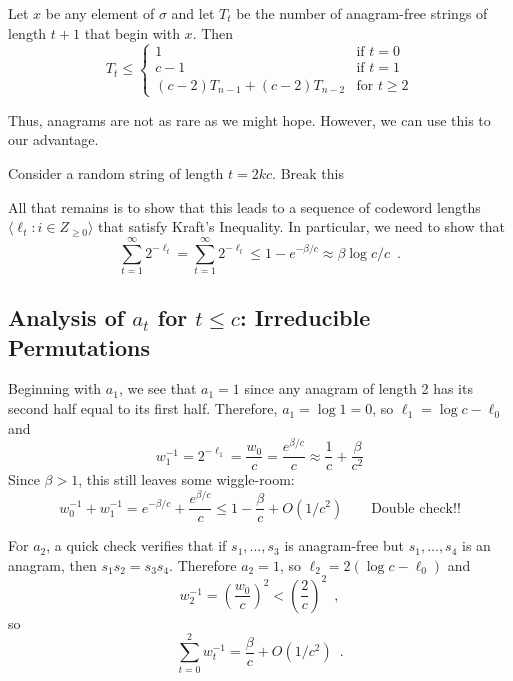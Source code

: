 \documentclass{patmorin}
\begin{document}
Let $x$ be any element of $\sigma$ and let $T_t$ be the number of anagram-free strings of length $t+1$ that begin with $x$.  Then
\[
   T_t \le \begin{cases}
         1 & \text{if $t=0$} \\
         c-1 & \text{if $t=1$} \\
         (c-2)T_{n-1} + (c-2)T_{n-2} & \text{for $t\ge 2$}
       \end{cases}
\]



Thus, anagrams are not as rare as we might hope.  However, we can use this to our advantage.

Consider a random string of length $t=2kc$.  Break this 















All that remains is to show that this leads to a sequence of codeword lengths $\langle \ell_t : i\in Z_{\ge 0}\rangle$ that satisfy Kraft's Inequality.  In particular, we need to show that
\[
  \sum_{t=1}^\infty 2^{-\ell_t} = \sum_{t=1}^\infty 2^{-\ell_t} \le 1-e^{-\beta/c} \approx \beta\log c/c \enspace .
\]

\subsection{Analysis of $a_t$ for $t\le c$: Irreducible Permutations}

Beginning with $a_1$, we see that $a_1=1$ since any anagram of length 2 has its second half equal to its first half.  Therefore, $a_1=\log 1 = 0$, so $\ell_1=\log c - \ell_0$ and 
\[
   w_1^{-1} = 2^{-\ell_1} = \frac{w_0}{c} = \frac{e^{\beta/c}}{c} \approx \frac{1}{c}+\frac{\beta}{c^2}
\]
Since $\beta >1$, this still leaves some wiggle-room:
\[
    w_0^{-1} + w_1^{-1} = e^{-\beta/c} + \frac{e^{\beta/c}}{c}
    \le 1 - \frac{\beta}{c} + O(1/c^2)  \qquad \text{Double check!!}
\]

For $a_2$, a quick check verifies that if $s_1,\ldots,s_3$ is anagram-free but $s_1,\ldots,s_4$ is an anagram, then $s_1s_2=s_3s_4$.  Therefore $a_2=1$, so
$\ell_2 = 2(\log c - \ell_0)$ and
\[
   w_2^{-1} = \left(\frac{w_0}{c}\right)^2 < \left(\frac{2}{c}\right)^2 \enspace , 
\]
so 
\[
  \sum_{t=0}^2 w_t^{-1} = \frac{\beta}{c} + O(1/c^2) \enspace .
\]
\end{document}
